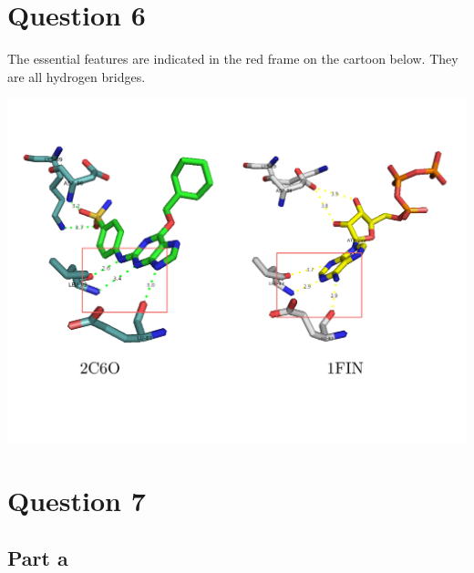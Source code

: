 \documentclass[11pt, a4paper,titlepage]{article}
\begin{document}
\section*{Question 6}
The essential features are indicated in the red frame on the cartoon
below. They are all hydrogen bridges.

\includegraphics[width=17cm]{./Figures/6.pdf}

\section*{Question 7}
\subsection*{Part a}
\end{document}
